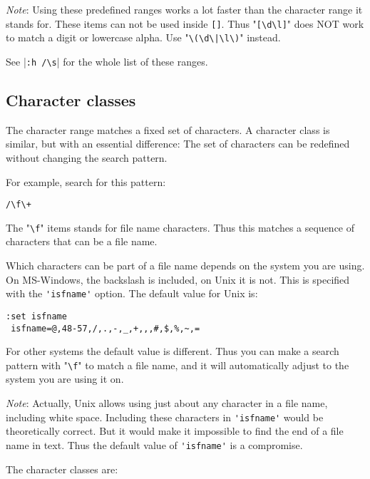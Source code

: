 \emph{Note}:
Using these predefined ranges works a lot faster than the character range it stands for.
These items can not be used inside \verb![]!.
Thus "\verb![\d\l]!" does NOT work to match a digit or lowercase alpha.
Use "\verb!\(\d\|\l\)!" instead.

See |\verb!:h /\s!| for the whole list of these ranges.
\subsection{Character classes}
The character range matches a fixed set of characters.
A character class is similar, but with an essential difference: The set of characters can be redefined without changing the search pattern.

For example, search for this pattern:

\begin{Verbatim}[samepage=true]
 /\f\+
\end{Verbatim}

The "\verb!\f!" items stands for file name characters.
Thus this matches a sequence of characters that can be a file name.

Which characters can be part of a file name depends on the system you are using.
On MS-Windows, the backslash is included, on Unix it is not.
This is specified with the \verb!'isfname'! option.
The default value for Unix is:

\begin{Verbatim}[samepage=true]
 :set isfname
 isfname=@,48-57,/,.,-,_,+,,,#,$,%,~,=
\end{Verbatim}

For other systems the default value is different.
Thus you can make a search pattern with "\verb!\f!" to match a file name, and it will automatically adjust to the system you are using it on.

\emph{Note}: Actually, Unix allows using just about any character in a file name, including white space.
Including these characters in \verb!'isfname'! would be theoretically correct.
But it would make it impossible to find the end of a file name in text.
Thus the default value of \verb!'isfname'! is a compromise.

The character classes are:

